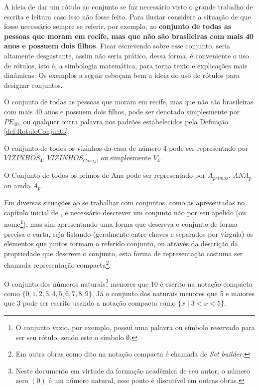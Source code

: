 A ideia de dar um rótulo ao conjunto se faz necessário visto o grande trabalho de escrita e leitura caso isso não fosse feito. Para ilustar considere a situação de que fosse necessário sempre se referir, por exemplo, ao \textbf{conjunto de todas as pessoas que moram em recife, mas que não são brasileiras com mais 40 anos e possuem dois filhos}. Ficar escrevendo sobre esse conjunto, seria altamente desgastante, assim não seria prático, dessa forma, é conveniente o uso de rótulos, isto é, a simbologia matemática, para torna texto e explicações mais dinâmicas. Os exemplos a seguir esboçam bem a ideia do uso de rótulos para designar conjuntos.

\begin{exemplo}\label{exe:RotuloConjunto1}
  O conjunto de todas as pessoas que moram em recife, mas que não são brasileiras com mais 40 anos e possuem dois filhos, pode ser denotado simplesmente por $PE_{40}$, ou qualquer outra palavra nos padrões estabelecidos pela Definição \ref{def:RotuloConjunto}.
\end{exemplo}

\begin{exemplo}\label{exe:RotuloConjunto2}
	O conjunto de todos os vizinhos da casa de número 4 pode ser representado por $VIZINHOS_4$, $VIZINHOS_{Casa_4}$, ou simplesmente  $V_4$.
\end{exemplo}

\begin{exemplo}\label{exe:RotuloConjunto3}
  O Conjunto de todos os primos de Ana pode ser representado por $A_{primos}$, $ANA_{p}$ ou ainda $A_p$.
\end{exemplo}

Em diversas situações ao se trabalhar com conjuntos, como as apresentadas no capítulo inicial de \cite{lipschutz1978-TC}, é necessário descrever um conjunto não por seu apelido (ou nome\footnote{O conjunto vazio, por exemplo, possui uma palavra ou símbolo reservado para ser seu rótulo, sendo este o símbolo $\emptyset$.}), mas sim apresentando uma forma que descreva o conjunto de forma precisa e curta, seja listando (geralmente entre chaves e separados por vírgula) os elementos que juntos formam o referido conjunto, ou através da descrição da propriedade que descreve o conjunto, esta forma de representação costuma ser chamada representação compacta\footnote{Em outra obras como dito \cite{fmcbook} na notação compacta é chamada de \itshape{Set builder}.}.

\begin{exemplo}\label{exe:SetBuilder1}
  O conjunto dos números naturais\footnote{Neste documento em virtude da formação acadêmica de seu autor, o número zero $(0)$ é um número natural, esse ponto é discutível em outras obras.} menores que 10 é escrito na notação compacta como  $\{0, 1, 2, 3, 4, 5, 6, 7, 8, 9\}$, Já o conjunto dos naturais menores que 5 e maiores que 3 pode ser escrito usando a notação compacta como $\{x \mid 3 < x < 5\}$.
\end{exemplo}

